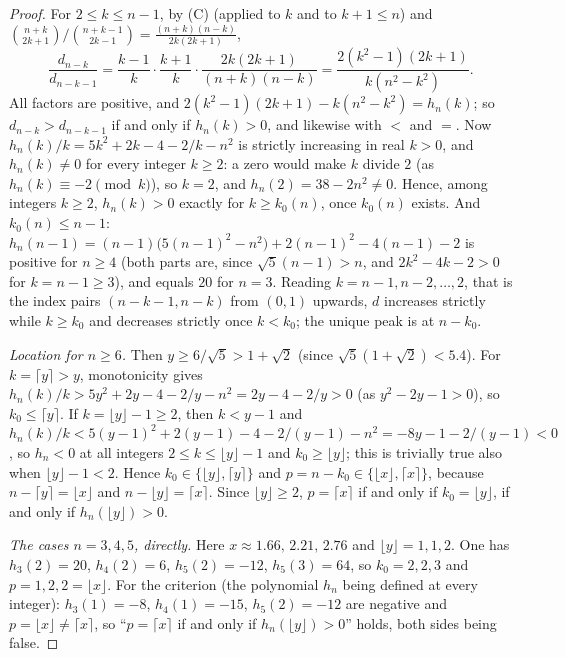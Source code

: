 \documentclass[11pt]{amsart}
\theoremstyle{definition}
\theoremstyle{remark}
\begin{document}
\begin{proof}
For $2\le k\le n-1$, by (C) (applied to $k$ and to $k+1\le n$) and
$\binom{n+k}{2k+1}/\binom{n+k-1}{2k-1}=\frac{(n+k)(n-k)}{2k(2k+1)}$,
\[
\frac{d_{n-k}}{d_{n-k-1}}=\frac{k-1}{k}\cdot\frac{k+1}{k}\cdot\frac{2k(2k+1)}{(n+k)(n-k)}
=\frac{2(k^2-1)(2k+1)}{k(n^2-k^2)} .
\]
All factors are positive, and $2(k^2-1)(2k+1)-k(n^2-k^2)=h_n(k)$; so
$d_{n-k}>d_{n-k-1}$ if and only if $h_n(k)>0$, and likewise with $<$ and $=$.
Now $h_n(k)/k=5k^2+2k-4-2/k-n^2$ is strictly increasing in real $k>0$, and
$h_n(k)\ne0$ for every integer $k\ge2$: a zero would make $k$ divide $2$
(as $h_n(k)\equiv-2\pmod k$), so $k=2$, and $h_n(2)=38-2n^2\ne0$. Hence,
among integers $k\ge2$, $h_n(k)>0$ exactly for $k\ge k_0(n)$, once $k_0(n)$
exists. And $k_0(n)\le n-1$:
$h_n(n-1)=(n-1)\bigl(5(n-1)^2-n^2\bigr)+2(n-1)^2-4(n-1)-2$ is positive for
$n\ge4$ (both parts are, since $\sqrt5(n-1)>n$, and $2k^2-4k-2>0$ for
$k=n-1\ge3$), and equals $20$ for $n=3$. Reading $k=n-1,n-2,\dots,2$, that is
the index pairs $(n-k-1,n-k)$ from $(0,1)$ upwards, $d$ increases strictly
while $k\ge k_0$ and decreases strictly once $k<k_0$; the unique peak is at
$n-k_0$.

\emph{Location for $n\ge6$.} Then $y\ge6/\sqrt5>1+\sqrt2$ (since
$\sqrt5(1+\sqrt2)<5.4$). For $k=\lceil y\rceil>y$, monotonicity gives
$h_n(k)/k>5y^2+2y-4-2/y-n^2=2y-4-2/y>0$ (as $y^2-2y-1>0$), so
$k_0\le\lceil y\rceil$. If $k=\lfloor y\rfloor-1\ge2$, then $k<y-1$ and
$h_n(k)/k<5(y-1)^2+2(y-1)-4-2/(y-1)-n^2=-8y-1-2/(y-1)<0$, so $h_n<0$ at all
integers $2\le k\le\lfloor y\rfloor-1$ and $k_0\ge\lfloor y\rfloor$; this is
trivially true also when $\lfloor y\rfloor-1<2$. Hence
$k_0\in\{\lfloor y\rfloor,\lceil y\rceil\}$ and
$p=n-k_0\in\{\lfloor x\rfloor,\lceil x\rceil\}$, because
$n-\lceil y\rceil=\lfloor x\rfloor$ and $n-\lfloor y\rfloor=\lceil x\rceil$.
Since $\lfloor y\rfloor\ge2$, $p=\lceil x\rceil$ if and only if
$k_0=\lfloor y\rfloor$, if and only if $h_n(\lfloor y\rfloor)>0$.

\emph{The cases $n=3,4,5$, directly.} Here $x\approx1.66,\,2.21,\,2.76$ and
$\lfloor y\rfloor=1,1,2$. One has $h_3(2)=20$, $h_4(2)=6$, $h_5(2)=-12$,
$h_5(3)=64$, so $k_0=2,2,3$ and $p=1,2,2=\lfloor x\rfloor$. For the criterion
(the polynomial $h_n$ being defined at every integer):
$h_3(1)=-8$, $h_4(1)=-15$, $h_5(2)=-12$ are negative and $p=\lfloor x\rfloor\ne\lceil x\rceil$,
so ``$p=\lceil x\rceil$ if and only if $h_n(\lfloor y\rfloor)>0$'' holds, both
sides being false.
\end{proof}
\end{document}
